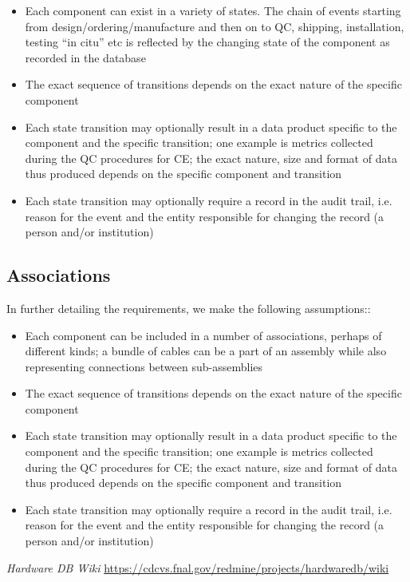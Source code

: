 \documentclass[pdftex,12pt,letter]{article}
\begin{document}
\begin{itemize}

\item Each component can exist in a variety of states. The chain of events starting from design/ordering/manufacture and
then on to QC, shipping, installation, testing ``in citu'' etc is reflected by the changing state of the component as recorded
in the database

\item The exact sequence of transitions depends on the exact nature of the specific  component

\item Each state transition may optionally result in a data product specific to the component and the specific transition;
one example is metrics collected during the QC procedures for CE; the exact nature, size and format of data thus produced
depends on the specific component and transition

\item Each state transition may optionally require a record in the audit trail, i.e.\,reason for the event and the entity
responsible for changing the record (a person and/or institution)

\end{itemize}

\subsection{Associations}
In further detailing the requirements, we make the following assumptions::

\begin{itemize}

\item Each component can be included in a number of associations, perhaps of different kinds; a bundle of cables
can be a part of an assembly while also representing connections between sub-assemblies

\item The exact sequence of transitions depends on the exact nature of the specific  component

\item Each state transition may optionally result in a data product specific to the component and the specific transition;
one example is metrics collected during the QC procedures for CE; the exact nature, size and format of data thus produced
depends on the specific component and transition

\item Each state transition may optionally require a record in the audit trail, i.e.\,reason for the event and the entity
responsible for changing the record (a person and/or institution)

\end{itemize}


\clearpage

\begin{thebibliography}{1}

{\textit{Hardware DB Wiki} \url{https://cdcvs.fnal.gov/redmine/projects/hardwaredb/wiki}}

\end{thebibliography}
\end{document}
